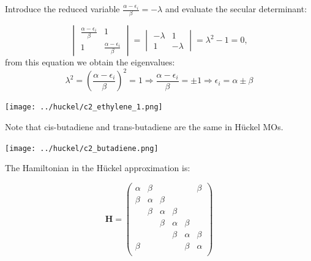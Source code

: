 \documentclass[../Main/chem532-notes.tex]{subfiles}
\begin{document}
\begin{example}[Ethylene]
Introduce the reduced variable $\frac{\alpha - \epsilon_i}{\beta} = - \lambda$ and evaluate the secular determinant:

\begin{equation}
\begin{vmatrix}
\frac{\alpha - \epsilon_i}{\beta} & 1 \\
1 & \frac{\alpha - \epsilon_i}{\beta}
\end{vmatrix}
= \begin{vmatrix}
-\lambda & 1 \\
1 & -\lambda
\end{vmatrix}
= \lambda^2 - 1 = 0,
\end{equation}
from this equation we obtain the eigenvalues:
\begin{equation}
\lambda^2 = \left(\frac{\alpha - \epsilon_i}{\beta}\right)^2 = 1
\Rightarrow
\frac{\alpha - \epsilon_i}{\beta} = \pm 1
\Rightarrow
\epsilon_i = \alpha \pm \beta
\end{equation}

\begin{center}
\texttt{[image: ../huckel/c2\_ethylene\_1.png]}
\end{center}

\end{example}

\begin{example}[Butadiene]
Note that cis-butadiene and trans-butadiene are the same in Hückel MOs.
\begin{center}
\texttt{[image: ../huckel/c2\_butadiene.png]}
\end{center}

\end{example}

\begin{example}[Benzene]
The Hamiltonian in the H\"{u}ckel approximation is:

\begin{equation}
\mathbf{H}
=
\begin{pmatrix}
\alpha & \beta & & & & \beta\\
\beta & \alpha & \beta & & & \\
& \beta & \alpha & \beta & & \\
& & \beta & \alpha & \beta & \\
& & & \beta & \alpha & \beta \\
\beta  & & & & \beta & \alpha \\
\end{pmatrix}
\end{equation}
\end{example}
\end{document}
